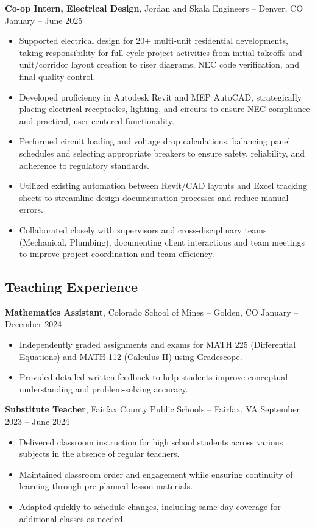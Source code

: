\documentclass[11pt]{article}       %
\begin{document}
\textbf{Co-op Intern, Electrical Design}, Jordan and Skala Engineers -- Denver, CO \hfill January -- June 2025
\vspace{-5pt}
\begin{itemize}
  \item Supported electrical design for 20+ multi-unit residential developments, taking responsibility for full-cycle project activities from initial takeoffs and unit/corridor layout creation to riser diagrams, NEC code verification, and final quality control.
  \item Developed proficiency in Autodesk Revit and MEP AutoCAD, strategically placing electrical receptacles, lighting, and circuits to ensure NEC compliance and practical, user-centered functionality.
  \item Performed circuit loading and voltage drop calculations, balancing panel schedules and selecting appropriate breakers to ensure safety, reliability, and adherence to regulatory standards.
  \item Utilized existing automation between Revit/CAD layouts and Excel tracking sheets to streamline design documentation processes and reduce manual errors.
  \item Collaborated closely with supervisors and cross-disciplinary teams (Mechanical, Plumbing), documenting client interactions and team meetings to improve project coordination and team efficiency.
\end{itemize}

\vspace{-5pt}
\subsection*{Teaching Experience}
\vspace{3pt}

\textbf{Mathematics Assistant}, Colorado School of Mines -- Golden, CO \hfill January -- December 2024
\vspace{-5pt}
\begin{itemize}
  \item Independently graded assignments and exams for MATH 225 (Differential Equations) and MATH 112 (Calculus II) using Gradescope.
  \item Provided detailed written feedback to help students improve conceptual understanding and problem-solving accuracy.
\end{itemize}

\textbf{Substitute Teacher}, Fairfax County Public Schools -- Fairfax, VA \hfill September 2023 -- June 2024
\vspace{-5pt}
\begin{itemize}
  \item Delivered classroom instruction for high school students across various subjects in the absence of regular teachers.
  \item Maintained classroom order and engagement while ensuring continuity of learning through pre-planned lesson materials.
  \item Adapted quickly to schedule changes, including same-day coverage for additional classes as needed.
\end{itemize}
\end{document}
